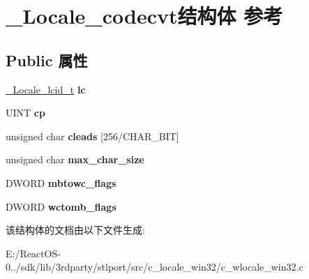 \hypertarget{struct___locale__codecvt}{}\section{\+\_\+\+Locale\+\_\+codecvt结构体 参考}
\label{struct___locale__codecvt}
\subsection*{Public 属性}
\begin{DoxyCompactItemize}
\item 
\mbox{\label{struct___locale__codecvt_ad72556933fb06cbb5ad42212c170007b}} 
\hyperlink{struct___locale__name__hint}{\+\_\+\+Locale\+\_\+lcid\+\_\+t} {\bfseries lc}
\item 
\mbox{\label{struct___locale__codecvt_ae7879b444927210f6dd0b3da805bdc80}} 
U\+I\+NT {\bfseries cp}
\item 
\mbox{\label{struct___locale__codecvt_a2fe16f8f84e4fde5626de18b18632b06}} 
unsigned char {\bfseries cleads} \mbox{[}256/C\+H\+A\+R\+\_\+\+B\+IT\mbox{]}
\item 
\mbox{\label{struct___locale__codecvt_a89a218d1890c14199a84fbeeb5520fda}} 
unsigned char {\bfseries max\+\_\+char\+\_\+size}
\item 
\mbox{\label{struct___locale__codecvt_acd4ba94ca84bf1a23f4f09600128683c}} 
D\+W\+O\+RD {\bfseries mbtowc\+\_\+flags}
\item 
\mbox{\label{struct___locale__codecvt_a05bd69daf3412960ae0031c392d5f948}} 
D\+W\+O\+RD {\bfseries wctomb\+\_\+flags}
\end{DoxyCompactItemize}


该结构体的文档由以下文件生成\+:\begin{DoxyCompactItemize}
\item 
E\+:/\+React\+O\+S-\/0../sdk/lib/3rdparty/stlport/src/c\+\_\+locale\+\_\+win32/c\+\_\+wlocale\+\_\+win32.\+c\end{DoxyCompactItemize}
